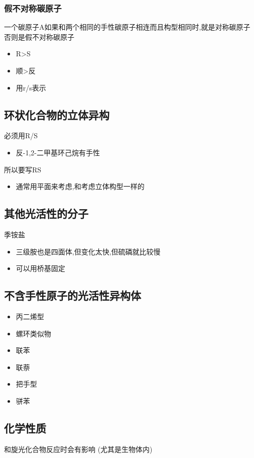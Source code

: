 \documentclass[11pt]{article}
\begin{document}
\subsubsection{假不对称碳原子}
\label{sec:orgca55728}
一个碳原子A如果和两个相同的手性碳原子相连而且构型相同时,就是对称碳原子
否则是假不对称碳原子
\begin{itemize}
\item R>S
\item 顺>反
\item 用r/s表示
\end{itemize}
\subsection{环状化合物的立体异构}
\label{sec:org57cb90c}
必须用R/S
\begin{itemize}
\item 反-1,2-二甲基环己烷有手性
\end{itemize}
所以要写RS
\begin{itemize}
\item 通常用平面来考虑,和考虑立体构型一样的
\end{itemize}
\subsection{其他光活性的分子}
\label{sec:org0548c9e}
季铵盐
\begin{itemize}
\item 三级胺也是四面体,但变化太快,但硫磷就比较慢
\item 可以用桥基固定
\end{itemize}
\subsection{不含手性原子的光活性异构体}
\label{sec:orgf9bfec0}
\begin{itemize}
\item 丙二烯型
\item 螺环类似物
\item 联苯
\item 联萘
\item 把手型
\item 骈苯
\end{itemize}
\subsection{化学性质}
\label{sec:org5d66cf3}

和旋光化合物反应时会有影响
(尤其是生物体内)
\end{document}
